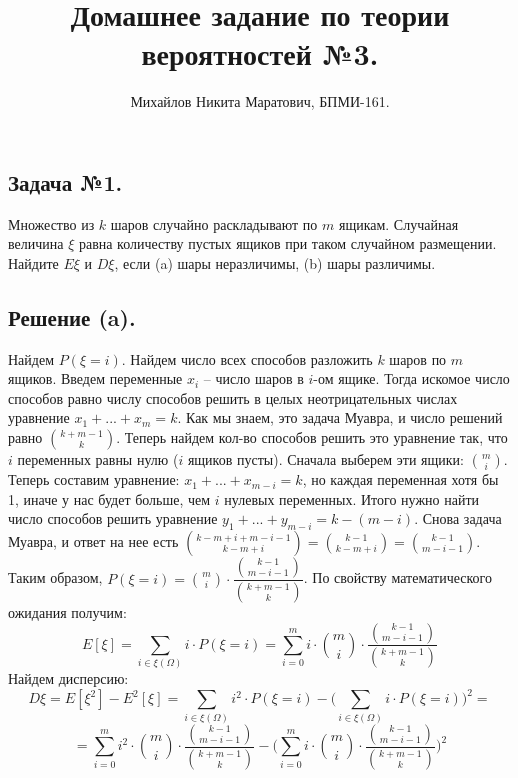 \documentclass[a4paper, 12pt]{article}
\title{
	Домашнее задание по теории вероятностей №3.
}
\author{Михайлов Никита Маратович, БПМИ-161.
}
\date{}
\newcommand{\D}{\displaystyle}
\begin{document}
\maketitle
\begin{spacing}{1}

\section{Задача №1.}
Множество из $k$ шаров случайно раскладывают по $m$ ящикам. Случайная величина $\xi$ равна количеству пустых ящиков при таком случайном
размещении. Найдите $E\xi$ и $D\xi$, если (a) шары неразличимы, (b) шары различимы.
\subsection{Решение (a).} Найдем $P(\xi = i)$. Найдем число всех способов разложить $k$ шаров по $m$ ящиков. Введем переменные $x_i$ -- число шаров в $i$-ом ящике. Тогда искомое число способов равно числу способов решить в целых неотрицательных числах уравнение $x_1 + ... + x_m = k$. Как мы знаем, это задача Муавра, и число решений равно $\binom{k + m - 1}{k}$. Теперь найдем кол-во способов решить это уравнение так, что $i$ переменных равны нулю ($i$ ящиков пусты). Сначала выберем эти ящики: $\binom{m}{i}$. Теперь составим уравнение: $x_1 + ... + x_{m - i} = k$, но каждая переменная хотя бы 1, иначе у нас будет больше, чем $i$ нулевых переменных. Итого нужно найти число способов решить уравнение $y_1 + ... + y_{m - i} = k - (m - i)$. Снова задача Муавра, и ответ на нее есть $\D \binom{k - m + i + m - i - 1}{k - m + i} = \binom{k - 1}{k - m + i} = \binom{k - 1}{m - i - 1}$. Таким образом, $\D P(\xi = i) = \binom{m}{i}\cdot\dfrac{\binom{k - 1}{m - i - 1}}{\binom{k + m - 1}{k}}$. По свойству математического ожидания получим:
$$
E[\xi] = \sum\limits_{i \in \xi(\Omega)} i \cdot P(\xi = i) = \sum\limits_{i = 0}^{m} i \cdot \binom{m}{i}\cdot\dfrac{\binom{k - 1}{m - i - 1}}{\binom{k + m - 1}{k}}
$$
Найдем дисперсию:
$$
D\xi = E[\xi^2] - E^2[\xi] = \sum\limits_{i \in \xi(\Omega)} i^2 \cdot P(\xi = i) - \Big(\sum\limits_{i \in \xi(\Omega)} i \cdot P(\xi = i)\Big)^2 = 
$$
$$= \sum\limits_{i = 0}^{m} i^2 \cdot \binom{m}{i}\cdot\dfrac{\binom{k - 1}{m - i - 1}}{\binom{k + m - 1}{k}} - \Big(\sum\limits_{i = 0}^{m} i \cdot \binom{m}{i}\cdot\dfrac{\binom{k - 1}{m - i - 1}}{\binom{k + m - 1}{k}}\Big)^2
$$

\end{spacing}
\end{document}
